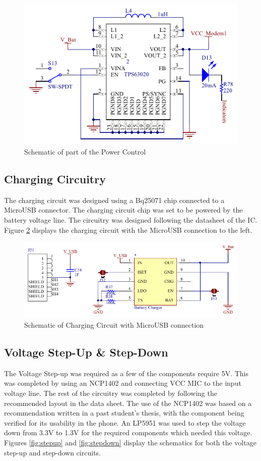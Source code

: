 \begin{figure}
	\includegraphics[width=0.5\linewidth]{Figures/powercontrol.pdf}\centering
	\caption{Schematic of part of the Power Control}
	\label{fig:powercontrol}
\end{figure}

\subsection{Charging Circuitry}

	The charging circuit was designed using a Bq25071 chip connected to a MicroUSB connector. 
The charging circuit chip was set to be powered by the battery voltage line. The circuitry was designed following the datasheet of the IC.
Figure \ref{fig:charger} displays the charging circuit with the MicroUSB connection to the left. 

\begin{figure}
	\includegraphics[width=0.5\linewidth]{Figures/battery_charger.pdf}\centering
	\caption{Schematic of Charging Circuit with MicroUSB connection}
	\label{fig:charger}
\end{figure}

\subsection{Voltage Step-Up \& Step-Down}

	The Voltage Step-up was required as a few of the components require 5V. 
This was completed by using an NCP1402 and connecting VCC MIC to the input voltage line. 
The rest of the circuitry was completed by following the recommended layout in the data sheet. 
The use of the NCP1402 was based on a recommendation written in a past student's thesis, with the component being verified for its usability in the phone. 
An LP5951 was used to step the voltage down from 3.3V to 1.3V for the required components which needed this voltage. 
Figures \ref{fig:stepup} and \ref{fig:stepdown} display the schematics for both the voltage step-up and step-down circuits.

